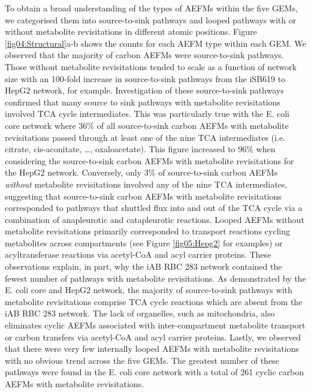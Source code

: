 \documentclass[12pt]{article}
\begin{document}

To obtain a broad understanding of the types of AEFMs within the five
GEMs, we categorised them into source-to-sink pathways and looped pathways
with or without metabolite revisitations in different atomic positions.
Figure \ref{fig04:Structural}a-b shows the counts for each AEFM type
within each GEM. We observed that the majority of carbon AEFMs were
source-to-sink pathways. Those without metabolite revisitations tended to
scale as a function of network size with an 100-fold increase in
source-to-sink pathways from the iSB619 to HepG2 network, for example.
Investigation of these source-to-sink pathways confirmed that many source
to sink pathways with metabolite revisitations involved TCA cycle
intermediates. This was particularly true with the E. coli core network
where 36\% of all source-to-sink carbon AEFMs with metabolite
revisitations passed through at least one of the nine TCA intermediates
(i.e. citrate, cis-aconitate, \ldots, oxaloacetate). This figure increased
to 96\% when considering the source-to-sink carbon AEFMs with metabolite
revisitations for the HepG2 network. Conversely, only 3\% of
source-to-sink carbon AEFMs \emph{without} metabolite revisitations
involved any of the nine TCA intermediates, suggesting that source-to-sink
carbon AEFMs with metabolite revisitations corresponded to pathways that
shuttled flux into and out of the TCA cycle via a combination of
anapleurotic and catapleurotic reactions. Looped AEFMs without metabolite
revisitations primarily corresponded to transport reactions cycling
metabolites across compartments (see Figure \ref{fig05:Hepg2} for
examples) or acyltransferase reactions via acetyl-CoA and acyl
carrier proteins. These observations explain, in part, why the iAB RBC 283
network contained the fewest number of pathways with metabolite
revisitations. As demonstrated by the E. coli core and HepG2 network, the
majority of source-to-sink pathways with metabolite revisitations comprise
TCA cycle reactions which are absent from the iAB RBC 283 network. The
lack of organelles, such as mitochondria, also eliminates cyclic AEFMs
associated with inter-compartment metabolite transport or carbon transfers
via acetyl-CoA and acyl carrier proteins. Lastly, we observed that there
were very few internally looped AEFMs with metabolite revisitations with
no obvious trend across the five GEMs. The greatest number of these
pathways were found in the E. coli core network with a total of 261 cyclic
carbon AEFMs with metabolite revisitations.
\end{document}
